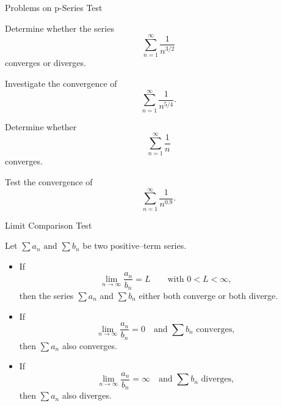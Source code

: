 \documentclass[12pt, a4paper]{article}
\begin{document}
\clearpage

\begin{heading}
    Problems on p-Series Test
\end{heading}

\begin{problem}
Determine whether the series
\[
\sum_{n=1}^{\infty} \frac{1}{n^{3/2}}
\]
converges or diverges.
\end{problem}

\clearpage

\begin{problem}
Investigate the convergence of
\[
\sum_{n=1}^{\infty} \frac{1}{n^{5/4}}.
\]
\end{problem}

\clearpage

\begin{problem}
Determine whether 
\[
\sum_{n=1}^{\infty} \frac{1}{n}
\]
converges.
\end{problem}

\clearpage

\begin{problem}
Test the convergence of 
\[
\sum_{n=1}^{\infty} \frac{1}{n^{0.9}}.
\]
\end{problem}

\clearpage

\begin{heading}
	Limit Comparison Test
\end{heading}

\vspace{10pt}

\begin{theorem}
	Let 
	\(
	\sum a_n \text{ and } \sum b_n
	\)
	be two positive–term series.

	\begin{itemize}
		\item[(i)] If 
		\[
		\lim_{n \to \infty} \frac{a_n}{b_n} = L
		\qquad \text{with } 0 < L < \infty,
		\]
		then the series \(\sum a_n\) and \(\sum b_n\) either both converge or both diverge.

		\item[(ii)] If 
		\[
		\lim_{n \to \infty} \frac{a_n}{b_n} = 0
		\quad \text{and } \sum b_n \text{ converges},
		\]
		then \(\sum a_n\) also converges.

		\item[(iii)] If 
		\[
		\lim_{n \to \infty} \frac{a_n}{b_n} = \infty
		\quad \text{and } \sum b_n \text{ diverges},
		\]
		then \(\sum a_n\) also diverges.
	\end{itemize}
\end{theorem}
\end{document}
